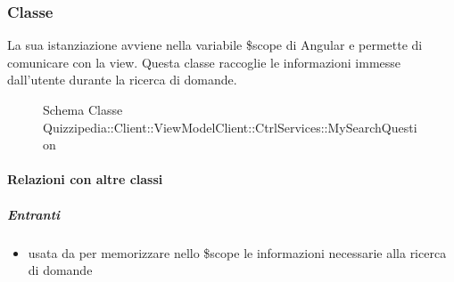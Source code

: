 \subsubsection{Classe }
La sua istanziazione avviene nella variabile \$scope di Angular e permette di comunicare con la view. Questa classe raccoglie le informazioni immesse dall'utente durante la ricerca di domande.
\begin{figure}[H]
\centering
\noindent{}
\caption[Schema Classe MySearchQuestion]{Schema Classe Quizzipedia::Client::ViewModelClient::CtrlServices::MySearchQuestion}
\end{figure}
\paragraph{Relazioni con altre classi}
\subparagraph{Entranti}
\begin{itemize}
\item usata da  per memorizzare nello \$scope le informazioni necessarie alla ricerca di domande
\end{itemize}
